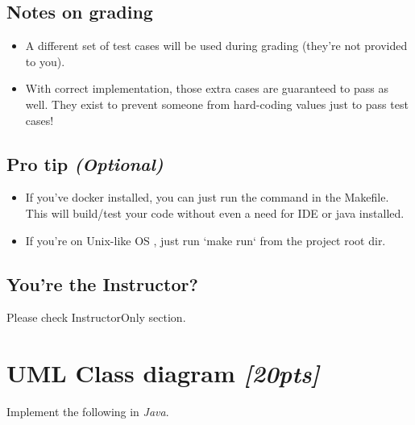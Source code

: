 \documentclass[titlepage,11pt]{article}
\begin{document}
\subsection{Notes on grading}
\begin{itemize}
	\item  A different set of test cases will be used during grading (they're not provided to you).
	\item  With correct implementation, those extra cases are guaranteed to pass as well. They exist to prevent someone from hard-coding values just to pass test cases!
\end{itemize}




\subsection{Pro tip \emph{(Optional)}}
\begin{itemize}
	\item If you've docker installed, you can just run the command in the Makefile.
	      This will build/test your code without even a need for IDE or java installed.
	\item If you're on Unix-like OS , just run `make run` from the project root dir.
\end{itemize}

\subsection{You're the Instructor?} Please check InstructorOnly section.

\pagebreak

\section{UML Class diagram \emph{[20pts]}}%


Implement the following  in \emph{Java}. \\
\end{document}
